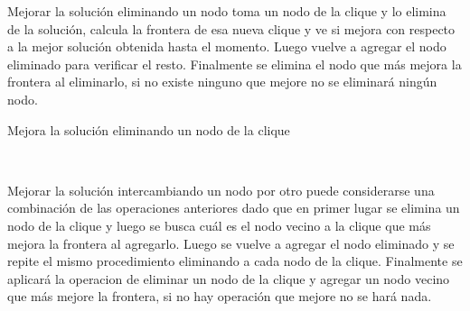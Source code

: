 Mejorar la solución eliminando un nodo toma un nodo de la clique y lo elimina de la solución, calcula la frontera de esa nueva clique y ve si mejora con respecto a la mejor solución obtenida hasta el momento. Luego vuelve a agregar el nodo eliminado para verificar el resto. Finalmente se elimina el nodo que más mejora la frontera al eliminarlo, si no existe ninguno que mejore no se eliminará ningún nodo.

\begin{algorithm}[H]
\begin{algorithmic}
\caption{Mejora la solución eliminando un nodo de la clique}
		\State{}\\
	\EndFunction
\end{algorithmic}
\end{algorithm}

Mejorar la solución intercambiando un nodo por otro puede considerarse una combinación de las operaciones anteriores dado que en primer lugar se elimina un nodo de la clique y luego se busca cuál es el nodo vecino a la clique que más mejora la frontera al agregarlo. Luego se vuelve a agregar el nodo eliminado y se repite el mismo procedimiento eliminando a cada nodo de la clique. Finalmente se aplicará la operacion de eliminar un nodo de la clique y agregar un nodo vecino que más mejore la frontera, si no hay operación que mejore no se hará nada.

